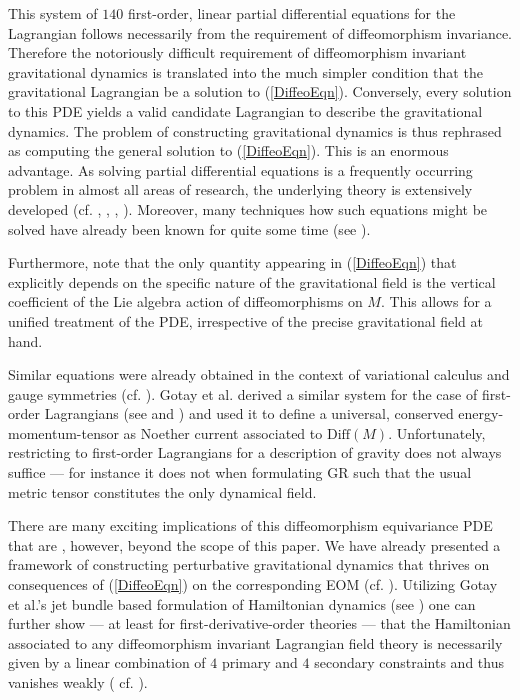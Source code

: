 \documentclass[%
 reprint,
nofootinbib,
 amsmath,amssymb,
 aps,
 prd,
floatfix,
]{revtex4-2}
\begin{document}
This system of $140$ first-order, linear partial differential equations for the Lagrangian follows necessarily from the requirement of diffeomorphism invariance. Therefore the notoriously difficult requirement of diffeomorphism invariant gravitational dynamics is translated into the much simpler condition that the gravitational Lagrangian be a solution to (\ref{DiffeoEqn}). Conversely, every solution to this PDE yields a valid candidate Lagrangian to describe the gravitational dynamics. 
The problem of constructing gravitational dynamics is thus rephrased as computing the general solution to (\ref{DiffeoEqn}). 
This is an enormous advantage. As solving partial differential equations is a frequently occurring problem in almost all areas of research, the underlying theory is extensively developed (cf. \cite{seiler2009involution}, \cite{hormander1994analysis}, \cite{hormander2009analysis}, \cite{hormander2015analysis}).
Moreover, many techniques how such equations might be solved have already been known for quite some time (see \cite{Hilbert}).

Furthermore, note that the only quantity appearing in (\ref{DiffeoEqn}) that explicitly depends on the specific nature of the gravitational field is the vertical coefficient of the Lie algebra action of diffeomorphisms on $M$. This allows for a unified treatment of the PDE, irrespective of the precise gravitational field at hand. 

Similar equations were already obtained in the context of variational calculus and gauge symmetries (cf. \cite{article}). 
Gotay et al. derived a similar system for the case of first-order Lagrangians (see \cite{Gotay1992StressEnergyMomentumTA} and \cite{1998physics...1019G}) and used it to define a universal, conserved energy-momentum-tensor as Noether current associated to $\mathrm{Diff}(M)$. 
Unfortunately, restricting to first-order Lagrangians for a description of gravity does not always suffice --- for instance it does not when formulating GR such that the usual metric tensor constitutes the only dynamical field.

There are many exciting implications of this diffeomorphism equivariance PDE that are , however, beyond the scope of this paper. We have already presented a framework of constructing perturbative gravitational dynamics that thrives on  consequences of (\ref{DiffeoEqn}) on the corresponding EOM (cf. \cite{TobiR}).
Utilizing Gotay et al.'s jet bundle based formulation of Hamiltonian dynamics (see \cite{2004math.ph..11032G}) one can further show --- at least for first-derivative-order theories --- that the Hamiltonian associated to any diffeomorphism invariant Lagrangian field theory is necessarily given by a linear combination of $4$ primary and $4$ secondary constraints and thus vanishes weakly ( cf. \cite{TobiMaster}).
\end{document}
